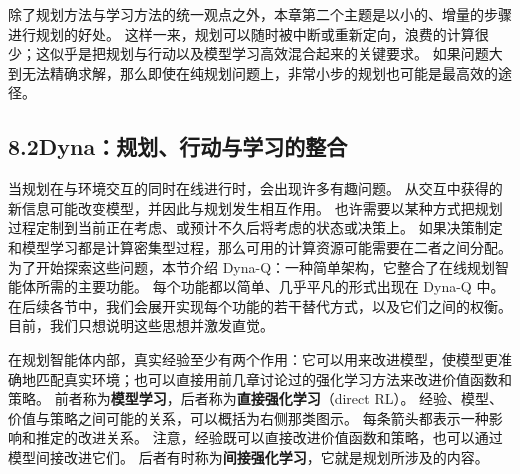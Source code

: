 \documentclass[UTF8,12pt,a4paper,fontset=fandol]{ctexart}
\begin{document}
\begin{center}
\end{center}

除了规划方法与学习方法的统一观点之外，本章第二个主题是以小的、增量的步骤进行规划的好处。
这样一来，规划可以随时被中断或重新定向，浪费的计算很少；这似乎是把规划与行动以及模型学习高效混合起来的关键要求。
如果问题大到无法精确求解，那么即使在纯规划问题上，非常小步的规划也可能是最高效的途径。

\subsection*{8.2\quad Dyna：规划、行动与学习的整合}

当规划在与环境交互的同时在线进行时，会出现许多有趣问题。
从交互中获得的新信息可能改变模型，并因此与规划发生相互作用。
也许需要以某种方式把规划过程定制到当前正在考虑、或预计不久后将考虑的状态或决策上。
如果决策制定和模型学习都是计算密集型过程，那么可用的计算资源可能需要在二者之间分配。
为了开始探索这些问题，本节介绍 Dyna-Q：一种简单架构，它整合了在线规划智能体所需的主要功能。
每个功能都以简单、几乎平凡的形式出现在 Dyna-Q 中。
在后续各节中，我们会展开实现每个功能的若干替代方式，以及它们之间的权衡。
目前，我们只想说明这些思想并激发直觉。

在规划智能体内部，真实经验至少有两个作用：它可以用来改进模型，使模型更准确地匹配真实环境；也可以直接用前几章讨论过的强化学习方法来改进价值函数和策略。
前者称为\textbf{模型学习}，后者称为\textbf{直接强化学习}（direct RL）。
经验、模型、价值与策略之间可能的关系，可以概括为右侧那类图示。
每条箭头都表示一种影响和推定的改进关系。
注意，经验既可以直接改进价值函数和策略，也可以通过模型间接改进它们。
后者有时称为\textbf{间接强化学习}，它就是规划所涉及的内容。
\end{document}
